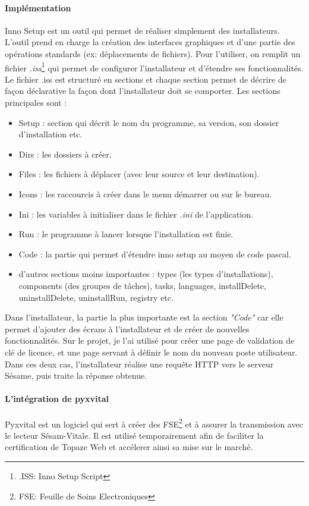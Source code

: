 \paragraph*{Implémentation\\}
Inno Setup est un outil qui permet de réaliser simplement des installateurs. L'outil prend en charge la création des interfaces graphiques et d'une partie des opérations standards (ex: déplacements de fichiers). Pour l'utiliser, on remplit un fichier \textit{.iss}\footnote{.ISS: Inno Setup Script} qui permet de configurer l'installateur et d'étendre ses fonctionnalités. Le fichier .iss est structuré en sections et chaque section permet de décrire de façon déclarative la façon dont l'installateur doit se comporter. Les sections principales sont : 
\begin{itemize}
\item Setup : section qui décrit le nom du programme, sa version, son dossier d'installation etc.
\item Dirs : les dossiers à créer.
\item Files : les fichiers à déplacer (avec leur source et leur destination).
\item Icons : les raccourcis à créer dans le menu démarrer ou sur le bureau.
\item Ini : les variables à initialiser dans le fichier \textit{.ini} de l'application.
\item Run : le programme à lancer lorsque l'installation est finie.
\item Code : la partie qui permet d'étendre inno setup au moyen de code pascal.
\item d'autres sections moins importantes : types (les types d'installations), components (des groupes de tâches), tasks, languages, installDelete, uninstallDelete, uninstallRun, registry etc.
\end{itemize}  

Dans l'installateur, la partie la plus importante est la section \textit{"Code"} car elle permet d'ajouter des écrans à l'installateur et de créer de nouvelles fonctionnalités. Sur le projet, je l'ai utilisé pour créer une page de validation de clé de licence, et une page servant à définir le nom du nouveau poste utilisateur.\\
Dans ces deux cas, l'installateur réalise une requête HTTP vers le serveur Sésame, puis traite la réponse obtenue. 

\paragraph*{L'intégration de pyxvital\\}
Pyxvital est un logiciel qui sert à créer des FSE\footnote{FSE: Feuille de Soins Electroniques} et à assurer la transmission avec le lecteur Sésam-Vitale. Il est utilisé temporairement afin de faciliter la certification de Topaze Web et accélerer ainsi sa mise sur le marché.

